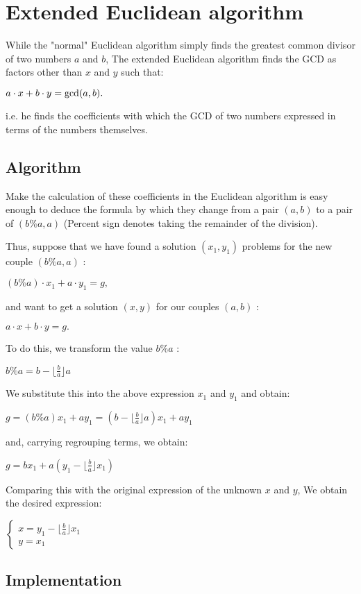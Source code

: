 \section{ Extended Euclidean algorithm }
While the "normal" Euclidean algorithm simply finds the greatest common divisor of two numbers $a$ and $b$, The extended Euclidean algorithm finds the GCD as factors other than $x$ and $y$ such that:

$a \cdot x + b \cdot y = {\rm gcd} (a, b).$

i.e. he finds the coefficients with which the GCD of two numbers expressed in terms of the numbers themselves.

\subsection{ Algorithm }

Make the calculation of these coefficients in the Euclidean algorithm is easy enough to deduce the formula by which they change from a pair $(a, b)$ to a pair of $(b \% a, a)$ (Percent sign denotes taking the remainder of the division).

Thus, suppose that we have found a solution $(x_1, y_1)$ problems for the new couple $(b \% a, a)$ :

$(b \% a) \cdot x_1 + a \cdot y_1 = g,$

and want to get a solution $(x, y)$ for our couples $(a, b)$ :

$a \cdot x + b \cdot y = g.$

To do this, we transform the value $b \% a$ :

$b\%a=b-\lfloor\frac{b}{a}\rfloor a$

We substitute this into the above expression $x_1$ and $y_1$ and obtain:

$g=(b\%a)x_{1}+ay_{1}=\left(b-\lfloor\frac{b}{a}\rfloor a\right)x_{1}+ay_{1}$

and, carrying regrouping terms, we obtain:

$g=bx_{1}+a\left(y_{1}-\lfloor\frac{b}{a}\rfloor x_{1}\right)$

Comparing this with the original expression of the unknown $x$ and $y$, We obtain the desired expression:

$\begin{cases}
x=y_{1}-\lfloor\frac{b}{a}\rfloor x_{1}\\
y=x_{1}
\end{cases}
 $

\subsection{ Implementation }

